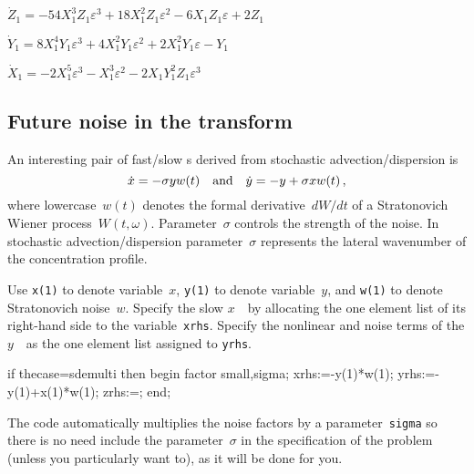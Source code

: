 \documentclass[11pt,a5paper]{article}
\begin{document}
\begin{math}
\dot Z_{1}=-54 X_{1}^{3} Z_{1} \varepsilon ^{3}+18 X_{1}^{2} Z_{1} 
\varepsilon ^{2}-6 X_{1} Z_{1} \varepsilon +2 Z_{1}
\end{math}\par

\begin{math}
\dot Y_{1}=8 X_{1}^{4} Y_{1} \varepsilon ^{3}+4 X_{1}^{2} Y_{1} 
\varepsilon ^{2}+2 X_{1}^{2} Y_{1} \varepsilon -Y_{1}
\end{math}\par

\begin{math}
\dot X_{1}=-2 X_{1}^{5} \varepsilon ^{3}-X_{1}^{3} \varepsilon ^{2}-2 X_
{1} Y_{1}^{2} Z_{1} \varepsilon ^{3}
\end{math}



\subsection{Future noise in the transform}

An interesting pair of fast/slow \sde{}s derived from stochastic advection\slash dispersion is
\begin{equation}
\dot x=-\sigma yw(t) \quad\mbox{and}\quad \dot y=-y+\sigma x w(t)\,,
\end{equation}
where lowercase~$w(t)$ denotes the formal derivative~$dW/dt$ of a Stratonovich Wiener process~$W(t,\omega)$.
Parameter~$\sigma$ controls the strength of the noise.
In stochastic advection\slash dispersion parameter~$\sigma$ represents the lateral wavenumber of the concentration profile.  

Use \verb|x(1)| to denote variable~$x$, \verb|y(1)| to denote variable~$y$, and \verb|w(1)| to denote Stratonovich noise~$w$.
Specify the slow $x$~\sde\ by allocating the one element list of its right-hand side to the variable~\verb|xrhs|.
Specify the nonlinear and noise terms of the $y$~\sde\ as the one element list assigned to \verb|yrhs|.
\begin{reduce}
if thecase=sdemulti then begin
factor small,sigma;
xrhs:={-y(1)*w(1)};
yrhs:={-y(1)+x(1)*w(1)};
zrhs:={};
end;
\end{reduce}

The code automatically multiplies the noise factors by a parameter~\verb|sigma| so there is no need include the parameter~$\sigma$ in the specification of the problem (unless you particularly want to), as it will be done for you.
\end{document}
